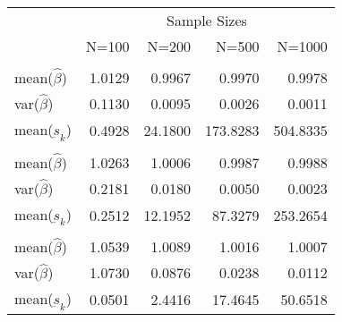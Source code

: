 
\begin{tabular}{lrrrr}
\toprule
\multicolumn{1}{c}{ } & \multicolumn{4}{c}{Sample Sizes} \\
\cmidrule(l{3pt}r{3pt}){2-5}
  & N=100 & N=200 & N=500 & N=1000\\
\midrule
\addlinespace[0.3em]
\multicolumn{5}{l}{\textbf{$ \rho = 0 $  }}\\
\hspace{1em}mean($\hat{\beta}$) & 1.0129 & 0.9967 & 0.9970 & 0.9978\\
\hspace{1em}var($\hat{\beta}$) & 0.1130 & 0.0095 & 0.0026 & 0.0011\\
\hspace{1em}mean($\underbar{s}_k$) & 0.4928 & 24.1800 & 173.8283 & 504.8335\\
\addlinespace[0.3em]
\multicolumn{5}{l}{\textbf{$ \rho = 0.5 $}}\\
\hspace{1em}mean($\hat{\beta}$) & 1.0263 & 1.0006 & 0.9987 & 0.9988\\
\hspace{1em}var($\hat{\beta}$) & 0.2181 & 0.0180 & 0.0050 & 0.0023\\
\hspace{1em}mean($\underbar{s}_k$) & 0.2512 & 12.1952 & 87.3279 & 253.2654\\
\addlinespace[0.3em]
\multicolumn{5}{l}{\textbf{$ \rho = 0.9 $}}\\
\hspace{1em}mean($\hat{\beta}$) & 1.0539 & 1.0089 & 1.0016 & 1.0007\\
\hspace{1em}var($\hat{\beta}$) & 1.0730 & 0.0876 & 0.0238 & 0.0112\\
\hspace{1em}mean($\underbar{s}_k$) & 0.0501 & 2.4416 & 17.4645 & 50.6518\\
\bottomrule
\end{tabular}
